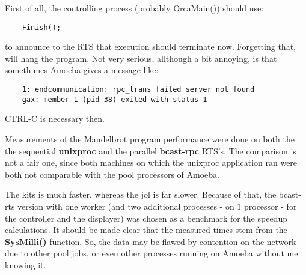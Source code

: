 
First of all, the controlling process (probably OrcaMain()) should use:
\begin{verbatim}
	Finish();
\end{verbatim}
to announce to the RTS that execution should terminate now. Forgetting that,
will hang the program. 
\Skip
Not very serious, allthough a bit annoying, is that somethimes Amoeba
gives a message like:
\begin{verbatim}
    1: endcommunication: rpc_trans failed server not found
    gax: member 1 (pid 38) exited with status 1
\end{verbatim}
CTRL-C is necessary then. 
\Skip


Measurements of the Mandelbrot program performance were done on both
the the sequential {\bf unixproc} and the parallel {\bf bcast-rpc} RTS's. 
\Skip
The comparison is not a fair one, since both machines on which the unixproc
application ran were both not comparable with the pool processors of Amoeba.

The kits is much faster, whereas the jol is far slower.
Because of that, the bcast-rts version with one worker (and
two additional processes - on 1 processor - for the controller and the 
displayer) was chosen as a benchmark for the speedup calculations. 
\Skip
It should be made clear that the measured times stem from the {\bf SysMilli()}
function. So, the data may be flawed by contention on the network due to
other pool jobs, or even other processes running on Amoeba without me knowing
it.

